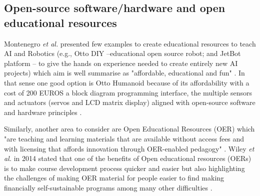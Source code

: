 \documentclass[conference]{IEEEtran}
\newcommand{\etal}{\textit{et al. }} %
\begin{document}
\subsection{Open-source software/hardware and open educational resources}
Montenegro \etal presented few examples to create educational resources to teach AI and Robotics (e.g., Otto DIY --educational open source robot; and JetBot platform -- to give the hands on experience needed to create entirely new AI projects) which aim is well summarise as "affordable, educational and fun" \cite{montenegro2021air4children}.
In that sense one good option is Otto Humanoid because of its affordability with a cost of 200 EUROS a block diagram programming interface, the multiple sensors and actuators (servos and LCD matrix display) aligned with open-source software and hardware principles \cite{OttoDIY:2016}.

Similarly, another area to consider are Open Educational Resources (OER) which "are teaching and learning materials that are available without access fees and with licensing that affords innovation through OER-enabled pedagogy" \cite{Clinton-Lisell2021}.
Wiley \etal in 2014 stated that one of the benefits of Open educational resources (OERs) is to make course development process quicker and easier but also highlighting the challenges of making OER material for people easier to find making financially self-sustainable programs among many other difficulties \cite{Wiley2014}.
\end{document}
